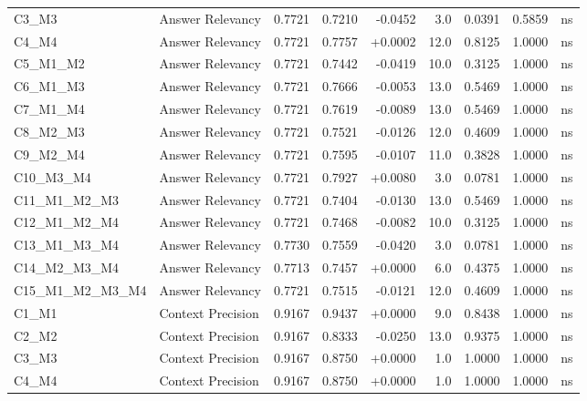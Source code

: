 \begin{table}[p]
\begin{tabular*}{\textwidth}{@{\extracolsep{\fill}} l l r r r r r r c @{}}
\addlinespace
C3\_M3          & Answer Relevancy     & 0.7721 & 0.7210 & -0.0452 & 3.0 & 0.0391 & 0.5859 & ns \\
\addlinespace
C4\_M4          & Answer Relevancy     & 0.7721 & 0.7757 & +0.0002 & 12.0 & 0.8125 & 1.0000 & ns \\
\addlinespace
C5\_M1\_M2      & Answer Relevancy     & 0.7721 & 0.7442 & -0.0419 & 10.0 & 0.3125 & 1.0000 & ns \\
\addlinespace
C6\_M1\_M3      & Answer Relevancy     & 0.7721 & 0.7666 & -0.0053 & 13.0 & 0.5469 & 1.0000 & ns \\
\addlinespace
C7\_M1\_M4      & Answer Relevancy     & 0.7721 & 0.7619 & -0.0089 & 13.0 & 0.5469 & 1.0000 & ns \\
\addlinespace
C8\_M2\_M3      & Answer Relevancy     & 0.7721 & 0.7521 & -0.0126 & 12.0 & 0.4609 & 1.0000 & ns \\
\addlinespace
C9\_M2\_M4      & Answer Relevancy     & 0.7721 & 0.7595 & -0.0107 & 11.0 & 0.3828 & 1.0000 & ns \\
\addlinespace
C10\_M3\_M4     & Answer Relevancy     & 0.7721 & 0.7927 & +0.0080 & 3.0 & 0.0781 & 1.0000 & ns \\
\addlinespace
C11\_M1\_M2\_M3 & Answer Relevancy     & 0.7721 & 0.7404 & -0.0130 & 13.0 & 0.5469 & 1.0000 & ns \\
\addlinespace
C12\_M1\_M2\_M4 & Answer Relevancy     & 0.7721 & 0.7468 & -0.0082 & 10.0 & 0.3125 & 1.0000 & ns \\
\addlinespace
C13\_M1\_M3\_M4 & Answer Relevancy     & 0.7730 & 0.7559 & -0.0420 & 3.0 & 0.0781 & 1.0000 & ns \\
\addlinespace
C14\_M2\_M3\_M4 & Answer Relevancy     & 0.7713 & 0.7457 & +0.0000 & 6.0 & 0.4375 & 1.0000 & ns \\
\addlinespace
C15\_M1\_M2\_M3\_M4 & Answer Relevancy     & 0.7721 & 0.7515 & -0.0121 & 12.0 & 0.4609 & 1.0000 & ns \\
\addlinespace
C1\_M1          & Context Precision    & 0.9167 & 0.9437 & +0.0000 & 9.0 & 0.8438 & 1.0000 & ns \\
\addlinespace
C2\_M2          & Context Precision    & 0.9167 & 0.8333 & -0.0250 & 13.0 & 0.9375 & 1.0000 & ns \\
\addlinespace
C3\_M3          & Context Precision    & 0.9167 & 0.8750 & +0.0000 & 1.0 & 1.0000 & 1.0000 & ns \\
\addlinespace
C4\_M4          & Context Precision    & 0.9167 & 0.8750 & +0.0000 & 1.0 & 1.0000 & 1.0000 & ns \\

\end{tabular*}
\end{table}
